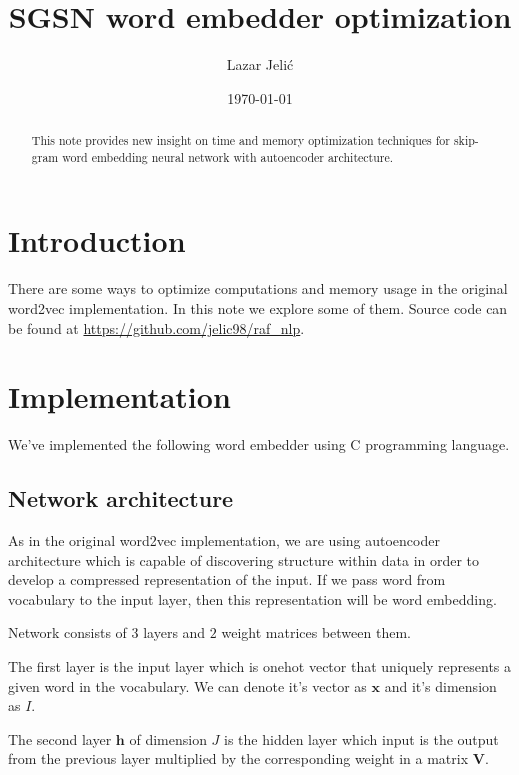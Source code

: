 \documentclass{article}
\title{SGSN word embedder optimization}
\author{Lazar Jelić}
\date{\today}
\begin{document}
\maketitle

\begin{abstract}

This note provides new insight on time and memory optimization techniques for
skip-gram word embedding neural network with autoencoder architecture.

\end{abstract}

\section{Introduction}

There are some ways to optimize computations and memory usage in the
original word2vec implementation. In this note we explore some of them. Source
code can be found at \url{https://github.com/jelic98/raf_nlp}.

\section{Implementation}

We've implemented the following word embedder using C programming language.

\subsection{Network architecture}

As in the original word2vec implementation, we are using autoencoder
architecture which is capable of discovering structure within data in order
to develop a compressed representation of the input. If we pass word from
vocabulary to the input layer, then this representation will be word embedding.

\medbreak

Network consists of $3$ layers and $2$ weight matrices between them.

The first layer is the input layer which is onehot vector that uniquely represents a given word in the vocabulary.
We can denote it's vector as $\boldsymbol{x}$ and it's dimension as $I$.

\medbreak

The second layer $\boldsymbol{h}$ of dimension $J$ is the hidden layer which
input is the output from the previous
layer multiplied by the corresponding weight in a matrix $\boldsymbol{V}$.
\end{document}
